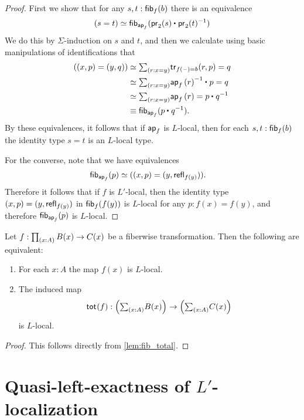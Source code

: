 \begin{proof}
First we show that for any $s,t:\mathsf{fib}_{f}(b)$ there is an equivalence
\begin{equation*}
\eqv{(s=t)}{\fib{\apfunc{f}}{\ct{\proj 2(s)}{\proj 2(t)^{-1}}}}
\end{equation*}
We do this by $\Sigma$-induction on $s$ and $t$, and then we calculate using basic manipulations of identifications that
\begin{align*}
(\pairr{x,p}=\pairr{y,q}) & \eqvsym \sm{r:x=y} \mathsf{tr}_{f(\blank)=b}(r,p)=q \\
& \eqvsym \sm{r:x=y} \ct{\ap{f}{r}^{-1}}{p}=q \\
& \eqvsym \sm{r:x=y} \ap{f}{r}=\ct{p}{q^{-1}} \\
& \jdeq \fib{\apfunc{f}}{\ct{p}{q^{-1}}}.
\end{align*}
By these equivalences, it follows that if $\mathsf{ap}_{f}$ is $L$-local, then for each $s,t:\mathsf{fib}_{f}(b)$ the identity type $s=t$ is an $L$-local type.

For the converse, note that we have equivalences
\begin{align*}
\mathsf{fib}_{\mathsf{ap}_{f}}(p) & \simeq ((x,p)=(y,\mathsf{refl}_{f(y)})).
\end{align*}
Therefore it follows that if $f$ is $L'$-local, then the identity type $(x,p)=(y,\mathsf{refl}_{f(y)})$ in $\mathsf{fib}_{f}(f(y))$ is $L$-local for any $p:f(x)=f(y)$, and therefore $\mathsf{fib}_{\mathsf{ap}_{f}}(p)$ is $L$-local. 
\end{proof}

\begin{thm}
Let $f:\prd{x:A}B(x)\to C(x)$ be a fiberwise transformation. Then the following are equivalent:
\begin{enumerate}
\item For each $x:A$ the map $f(x)$ is $L$-local.
\item The induced map 
\begin{equation*}
\total{f}:\Big(\sm{x:A}B(x)\Big)\to\Big(\sm{x:A}C(x)\Big)
\end{equation*}
is $L$-local.
\end{enumerate}
\end{thm}

\begin{proof}
This follows directly from \cref{lem:fib_total}.
\end{proof}

\section{Quasi-left-exactness of \texorpdfstring{$L'$}{L'}-localization}\label{ss:lex}


